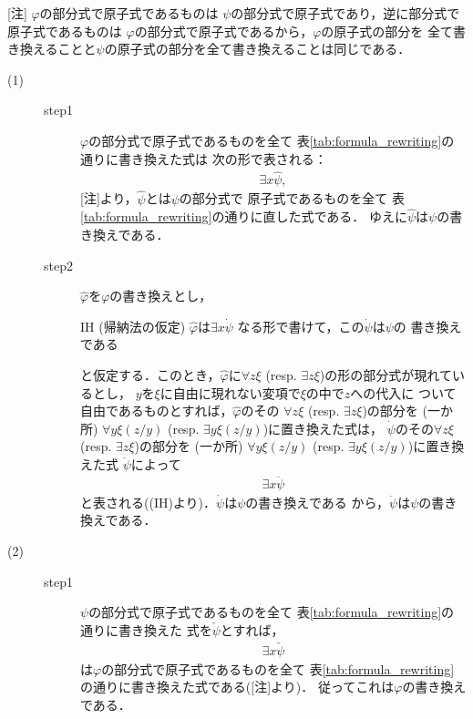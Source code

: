 	\begin{metaprf}\mbox{}
		[注] $\varphi$の部分式で原子式であるものは
		$\psi$の部分式で原子式であり，逆に部分式で原子式であるものは
		$\varphi$の部分式で原子式であるから，$\varphi$の原子式の部分を
		全て書き換えることと$\psi$の原子式の部分を全て書き換えることは同じである．
		\begin{description}
			\item[(1)] 
				\begin{description}
					\item[step1]
						$\varphi$の部分式で原子式であるものを全て
						表\ref{tab:formula_rewriting}の通りに書き換えた式は
						次の形で表される：
						\begin{align}
							\exists x \hat{\psi},
						\end{align}
						[注]より，$\hat{\psi}$とは$\psi$の部分式で
						原子式であるものを全て
						表\ref{tab:formula_rewriting}の通りに直した式である．
						ゆえに$\hat{\psi}$は$\psi$の書き換えである．
						
					\item[step2]
						$\widehat{\varphi}$を$\varphi$の書き換えとし，
						\begin{itembox}[l]{IH (帰納法の仮定)}
							$\widehat{\varphi}$は$\exists x \dot{\psi}$
							なる形で書けて，この$\dot{\psi}$は$\psi$の
							書き換えである
						\end{itembox}
						と仮定する．このとき，$\widehat{\varphi}$に$\forall z \xi$ 
						(resp. $\exists z \xi$)の形の部分式が現れているとし，
						$y$を$\xi$に自由に現れない変項で$\xi$の中で$z$への代入に
						ついて自由であるものとすれば，$\widehat{\varphi}$のその
						$\forall z \xi$ (resp. $\exists z \xi$)の部分を
						(一か所) $\forall y \xi(z/y)$
						(resp. $\exists y \xi(z/y)$)に置き換えた式は，
						$\dot{\psi}$のその$\forall z \xi$
						(resp. $\exists z \xi$)の部分を
						(一か所) $\forall y \xi(z/y)$
						(resp. $\exists y \xi(z/y)$)に置き換えた式
						$\ddot{\psi}$によって
						\begin{align}
							\exists x \ddot{\psi}
						\end{align}
						と表される((IH)より)．$\dot{\psi}$は$\psi$の書き換えである
						から，$\ddot{\psi}$は$\psi$の書き換えである．
				\end{description}
				
			\item[(2)]		
				\begin{description}
					\item[step1]
						$\psi$の部分式で原子式であるものを全て
						表\ref{tab:formula_rewriting}の通りに書き換えた
						式を$\check{\psi}$とすれば，
						\begin{align}
							\exists x \check{\psi}
						\end{align}
						は$\varphi$の部分式で原子式であるものを全て
						表\ref{tab:formula_rewriting}の通りに書き換えた式である([注]より)．
						従ってこれは$\varphi$の書き換えである．
								

\end{description}
\end{description}
\end{metaprf}
